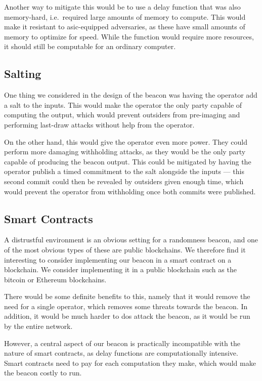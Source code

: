 Another way to mitigate this would be to use a delay function that was also memory-hard, i.e.\ required large amounts of memory to compute.
This would make it resistant to \gls{asic}-equipped adversaries, as these have small amounts of memory to optimize for speed.
While the function would require more resources, it should still be computable for an ordinary computer.

\subsection{Salting}
One thing we considered in the design of the beacon was having the operator add a salt to the inputs.
This would make the operator the only party capable of computing the output, which would prevent outsiders from pre-imaging and performing last-draw attacks without help from the operator.

On the other hand, this would give the operator even more power.
They could perform more damaging withholding attacks, as they would be the only party capable of producing the beacon output.
This could be mitigated by having the operator publish a timed commitment to the salt alongside the inputs --- this second commit could then be revealed by outsiders given enough time, which would prevent the operator from withholding once both commits were published.

\subsection{Smart Contracts}
A distrustful environment is an obvious setting for a randomness beacon, and one of the most obvious types of these are public blockchains.
We therefore find it interesting to consider implementing our beacon in a smart contract on a blockchain. We consider implementing it in a public blockchain such as the bitcoin or Ethereum blockchains.

There would be some definite benefits to this, namely that it would remove the need for a single operator, which removes some threats towards the beacon.
In addition, it would be much harder to \gls{dos} attack the beacon, as it would be run by the entire network.

However, a central aspect of our beacon is practically incompatible with the nature of smart contracts, as delay functions are computationally intensive.
Smart contracts need to pay for each computation they make, which would make the beacon costly to run.

